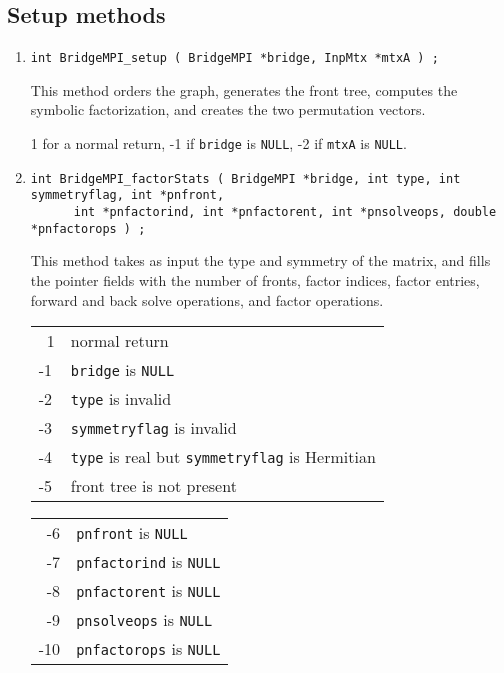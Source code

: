 \subsection{Setup methods}
\label{subsection:BridgeMPI:proto:setup}
\par
\begin{enumerate}
\item
\begin{verbatim}
int BridgeMPI_setup ( BridgeMPI *bridge, InpMtx *mtxA ) ;
\end{verbatim}
This method orders the graph, generates the front tree, computes
the symbolic factorization, and creates the two permutation vectors.
\par {}
1 for a  normal return,
-1 if \texttt{bridge} is \texttt{NULL},
-2 if \texttt{mtxA} is \texttt{NULL}.
\item
\begin{verbatim}
int BridgeMPI_factorStats ( BridgeMPI *bridge, int type, int symmetryflag, int *pnfront,
      int *pnfactorind, int *pnfactorent, int *pnsolveops, double *pnfactorops ) ;
\end{verbatim}
This method takes as input the type and symmetry of the matrix,
and fills the pointer fields with the number of fronts, factor
indices, factor entries, forward and back solve operations,
and factor operations.
\par {}
\begin{center}
\begin{tabular}{ll}
~1 & normal return \\
-1 & \texttt{bridge} is \texttt{NULL} \\
-2 & \texttt{type} is invalid \\
-3 & \texttt{symmetryflag} is invalid \\
-4 & \texttt{type} is real but \texttt{symmetryflag} is Hermitian \\
-5 & front tree is not present
\end{tabular}
\begin{tabular}{ll}
~-6 & \texttt{pnfront} is \texttt{NULL}  \\
~-7 & \texttt{pnfactorind} is \texttt{NULL}  \\
~-8 & \texttt{pnfactorent} is \texttt{NULL}  \\
~-9 & \texttt{pnsolveops} is \texttt{NULL}  \\
-10 & \texttt{pnfactorops} is \texttt{NULL} 
\end{tabular}
\end{center}
\end{enumerate}
\par
